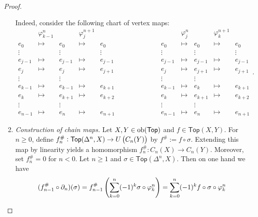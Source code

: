 \begin{proof}
\begin{enumerate}[label = \textit{Step \arabic*:},wide = 0pt, itemsep = 1.5ex]
			Indeed, consider the following chart of vertex maps:
			\begin{equation*}
				\begin{matrix}
					& \varphi_{k - 1}^n & & \varphi_j^{n + 1}\\
					e_0 & \mapsto & e_0 & \mapsto & e_0\\
					\vdots & & \vdots & & \vdots\\
					e_{j - 1} & \mapsto & e_{j - 1} & \mapsto & e_{j - 1}\\
					e_j & \mapsto & e_j & \mapsto & e_{j + 1}\\
					\vdots & & \vdots\\
					e_{k - 1} & \mapsto & e_{k - 1} & \mapsto & e_{k + 1}\\
					e_k & \mapsto & e_{k + 1} & \mapsto & e_{k + 2}\\
					\vdots & & \vdots\\
					e_{n - 1} & \mapsto & e_n & \mapsto & e_{n + 1}
				\end{matrix}
				\qquad\qquad\qquad
				\begin{matrix}
					& \varphi_j^n & & \varphi_k^{n + 1}\\
					e_0 & \mapsto & e_0 & \mapsto & e_0\\
					\vdots & & \vdots & & \vdots\\
					e_{j - 1} & \mapsto & e_{j - 1} & \mapsto & e_{j - 1}\\
					e_j & \mapsto & e_{j + 1} & \mapsto & e_{j + 1}\\
					\vdots & & \vdots\\
					e_{k - 1} & \mapsto & e_k & \mapsto & e_{k + 1}\\
					e_k & \mapsto & e_{k + 1} & \mapsto & e_{k + 2}\\
					\vdots & & \vdots\\
					e_{n - 1} & \mapsto & e_n & \mapsto & e_{n + 1}
				\end{matrix}.
			\end{equation*}
		\item \textit{Construction of chain maps.} Let $X,Y \in \operatorname{ob}(\mathsf{Top})$ and $f \in \mathsf{Top}(X,Y)$. For $n \geq 0$, define $f_n^\# : \mathsf{Top}(\Delta^n,X) \to U\del[1]{C_n(Y)}$ by $f^\# := f \circ \sigma$. Extending this map by linearity yields a homomorphism $f_n^\# : C_n(X) \to C_n(Y)$. Moreover, set $f_n^\# = 0$ for $n < 0$. Let $n \geq 1$ and $\sigma \in \mathsf{Top}(\Delta^n,X)$. Then on one hand we have
			\begin{equation*}
				(f_{n - 1}^\# \circ \partial_n)(\sigma) = f^\#_{n - 1}\del[4]{\sum_{k = 0}^n (-1)^k \sigma \circ \varphi^n_k} = \sum_{k = 0}^n (-1)^k f \circ \sigma \circ \varphi^n_k

\end{equation*}
\end{enumerate}
\end{proof}
